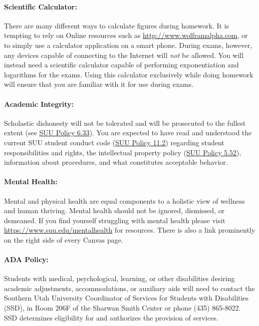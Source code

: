 \documentclass[12pt, letterpaper]{article}
\begin{document}
\paragraph{Scientific Calculator:}
There are many different ways to calculate figures during homework. It is tempting to rely on Online resources such as \href{http://www.wolframalpha.com}{http://www.wolframalpha.com}, or to simply use a calculator application on a smart phone. During exams, however, any devices capable of connecting to the Internet will \emph{not} be allowed. You will instead need a scientific calculator capable of performing exponentiation and logarithms for the exams. Using this calculator exclusively while doing homework will ensure that you are familiar with it for use during exams.

\paragraph{Academic Integrity:}
Scholastic dishonesty will not be tolerated and will be prosecuted to the fullest extent (see \href{https://www.suu.edu/policies/06/33.html}{SUU Policy 6.33}). You are expected to have read and understood the current SUU student conduct code (\href{https://www.suu.edu/policies/11/02.html}{SUU Policy 11.2}) regarding student responsibilities and rights, the intellectual property policy (\href{https://www.suu.edu/policies/05/52.html}{SUU Policy 5.52}), information about procedures, and what constitutes acceptable behavior.

\paragraph{Mental Health:}
Mental and physical health are equal components to a holistic view of wellness and human thriving. Mental health should not be ignored, dismissed, or demeaned. If you find yourself struggling with mental health please visit \href{https://www.suu.edu/mentalhealth}{https://www.suu.edu/mentalhealth} for resources. There is also a link prominently on the right side of every Canvas page.

\paragraph{ADA Policy:}
Students with medical, psychological, learning, or other disabilities desiring academic adjustments, accommodations, or auxiliary aids will need to contact the Southern Utah University Coordinator of Services for Students with Disabilities (SSD), in Room 206F of the Sharwan Smith Center or phone (435) 865-8022. SSD determines eligibility for and authorizes the provision of services.
\end{document}
